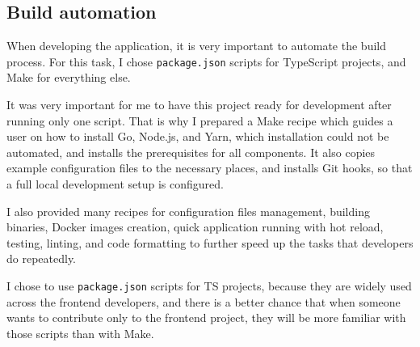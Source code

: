 \subsection{Build automation}\label{sec:build-automation}

When developing the application,
it is very important to automate the build process.
For this task,
I chose \texttt{package.json} scripts
for TypeScript projects,
and Make for everything else.

It was very important for me
to have this project ready for development
after running only one script.
That is why I prepared a Make recipe
which guides a user on how to install
Go, Node.js, and Yarn,
which installation could not be automated,
and installs the prerequisites for all components.
It also copies example configuration files
to the necessary places,
and installs Git hooks,
so that a full local development setup
is configured.

I also provided many recipes
for configuration files management,
building binaries,
Docker images creation,
quick application running with hot reload,
testing,
linting, and
code formatting
to further speed up the tasks
that developers do repeatedly.

I chose to use \texttt{package.json} scripts
for TS projects,
because they are widely used
across the frontend developers,
and there is a better chance
that when someone wants to contribute
only to the frontend project,
they will be more familiar with those scripts
than with Make.
